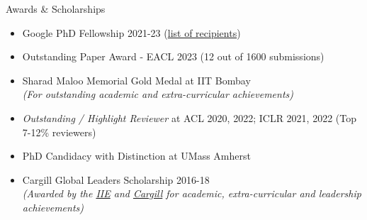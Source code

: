 \documentclass{resume} %
\begin{document}
\begin{rSection}{Awards \& Scholarships}
\vspace*{0.2in}
\begin{itemize}[leftmargin=*]
\setlength\itemsep{0.4em}
\item Google PhD Fellowship 2021-23 (\href{https://research.google/outreach/phd-fellowship/recipients/?category=2021}{list of recipients}) 
\item Outstanding Paper Award - EACL 2023 (12 out of 1600 submissions)
\item Sharad Maloo Memorial Gold Medal at IIT Bombay\\
\textit{(For outstanding academic and extra-curricular achievements)}
\item \emph{Outstanding / Highlight Reviewer} at ACL 2020, 2022; ICLR 2021, 2022  (Top 7-12\% reviewers)
\item PhD Candidacy with Distinction at UMass Amherst
\item Cargill Global Leaders Scholarship 2016-18 \\
\textit{(Awarded by the \href{https://en.wikipedia.org/wiki/Institute_of_International_Education}{IIE} and \href{https://en.wikipedia.org/wiki/Cargill}{Cargill} for academic, extra-curricular and leadership achievements)}
\end{itemize}
\end{rSection}
\end{document}
